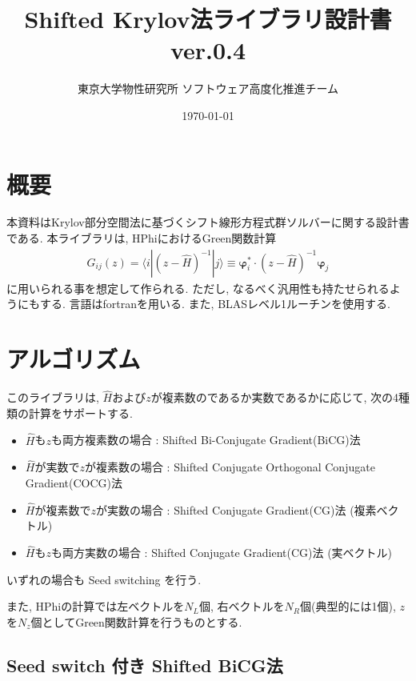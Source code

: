 \documentclass[12pt,titlepage]{jarticle}
\begin{document}
%
%
\title{Shifted Krylov法ライブラリ設計書 ver.0.4}
\author{東京大学物性研究所 ソフトウェア高度化推進チーム}
\date{\today}
\maketitle
%

%
%
\tableofcontents

\section{概要}

本資料はKrylov部分空間法に基づくシフト線形方程式群ソルバーに関する設計書である.
本ライブラリは, HPhiにおけるGreen関数計算
\begin{align}
  G_{i j}(z) = \langle i | (z-{\hat H})^{-1}| j \rangle \equiv 
  {\boldsymbol \varphi}_i^{*} \cdot (z-{\hat H})^{-1} {\boldsymbol \varphi}_j
\end{align}
に用いられる事を想定して作られる.
ただし, なるべく汎用性も持たせられるようにもする.
言語はfortranを用いる. 
また, BLASレベル1ルーチンを使用する.

\section{アルゴリズム}

このライブラリは, ${\hat H}$および$z$が複素数のであるか実数であるかに応じて,
次の4種類の計算をサポートする.

\begin{itemize}
\item ${\hat H}$も$z$も両方複素数の場合 : Shifted Bi-Conjugate Gradient(BiCG)法 \cite{BiCG}
\item ${\hat H}$が実数で$z$が複素数の場合 : Shifted Conjugate Orthogonal Conjugate Gradient(COCG)法 \cite{COCG}
\item ${\hat H}$が複素数で$z$が実数の場合 : Shifted Conjugate Gradient(CG)法 (複素ベクトル)
\item ${\hat H}$も$z$も両方実数の場合 : Shifted Conjugate Gradient(CG)法 (実ベクトル)
\end{itemize}
いずれの場合も Seed switching を行う.

また, HPhiの計算では左ベクトルを$N_L$個, 右ベクトルを$N_R$個(典型的には1個), 
$z$を$N_z$個としてGreen関数計算を行うものとする.

\subsection{Seed switch 付き Shifted BiCG法}
\end{document}
